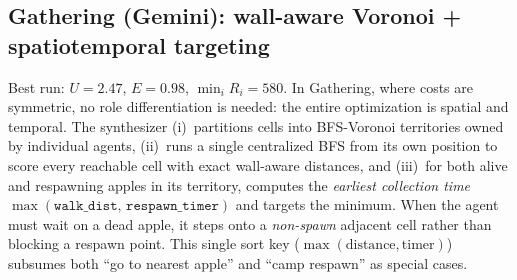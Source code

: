 \documentclass{article}
\begin{document}
\subsection{Gathering (Gemini): wall-aware Voronoi + spatiotemporal targeting}
\label{app:policy-gather}

Best run: $U{=}2.47$, $E{=}0.98$, $\min_i R_i{=}580$. In Gathering, where costs are symmetric, no role differentiation is needed: the entire optimization is spatial and temporal. The synthesizer (i)~partitions cells into BFS-Voronoi territories owned by individual agents, (ii)~runs a single centralized BFS from its own position to score every reachable cell with exact wall-aware distances, and (iii)~for both alive and respawning apples in its territory, computes the \emph{earliest collection time} $\max(\texttt{walk\_dist},\, \texttt{respawn\_timer})$ and targets the minimum. When the agent must wait on a dead apple, it steps onto a \emph{non-spawn} adjacent cell rather than blocking a respawn point. This single sort key  ($\max(\textrm{distance}, \textrm{timer})$)  subsumes both ``go to nearest apple'' and ``camp respawn'' as special cases.
\end{document}
